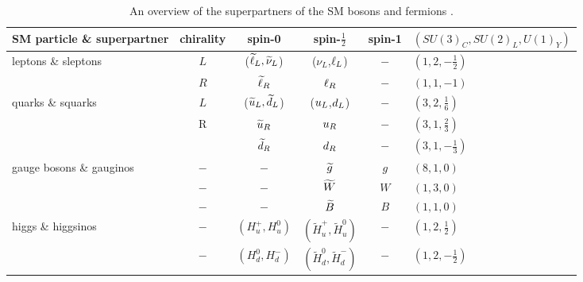 \begin{table}[ht!]
\def\arraystretch{1.2}
\setlength{\belowcaptionskip}{6pt}
\small
\centering
\caption{An overview of the superpartners of the SM bosons and fermions \cite{Martin:1997ns}.}
\label{tab:susy}
\begin{tabular}{l c c c c l}
        \hline \hline
        SM particle \& superpartner              & chirality         &spin-0                 & spin-$\frac{1}{2}$                              &spin-1 &\small{$(SU(3)_{C},SU(2)_{L},U(1)_{Y})$}\\\hline
        \multirow{2}{*}{leptons \& sleptons}     & $L$               &($\widetilde{\ell}_{L},\widetilde{\nu}_{L}$)      & ($\nu_{L}$,$\ell_{L}$)                             &$-$    & $(1,2,-\frac{1}{2})$ \\
                                                 & $R$               &$\widetilde{\ell}_{R}$               & $\ell_{R}$                                         &$-$    & $(1,1,-1)$ \\\hline
        \multirow{3}{*}{quarks \& squarks}       & $L$               &($\widetilde{u}_{L},\widetilde{d}_{L}$)      & ($u_{L}$,$d_{L}$)                               &$-$    & $(3,2,\frac{1}{6})$ \\
                                                 & \multirow{2}{*}{R}&$\widetilde{u}_{R}$                & $u_{R}$                                          &$-$    & $(3,1,\frac{2}{3})$ \\
                                                 &                   &$\widetilde{d}_{R}$              & $d_{R}$                                        &$-$    & $(3,1,-\frac{1}{3})$ \\\hline
        \multirow{3}{*}{gauge bosons \& gauginos}& $-$               &$-$                    & $\widetilde{g}$                                       &$g$    & $(8,1,0)$ \\
                                                 & $-$               &$-$                    & $\widetilde{W}$                                         &$W$    & $(1,3,0)$ \\
                                                 & $-$               &$-$                    & $\widetilde{B}$                                         &$B$    & $(1,1,0)$ \\\hline
        \multirow{2}{*}{higgs \& higgsinos}      & $-$               &$(H^{+}_{u},H^{0}_{u})$& $(\widetilde{H}^{+}_{u},\widetilde{H}^{0}_{u})$ &$-$    & $(1,2,\frac{1}{2})$ \\
                                                 & $-$               &$(H^{0}_{d},H^{-}_{d})$& $(\widetilde{H}^{0}_{d},\widetilde{H}^{-}_{d})$ &$-$    & $(1,2,-\frac{1}{2})$ \\
\hline\hline
\end{tabular}
\end{table}                                                                                                                                                                                             

